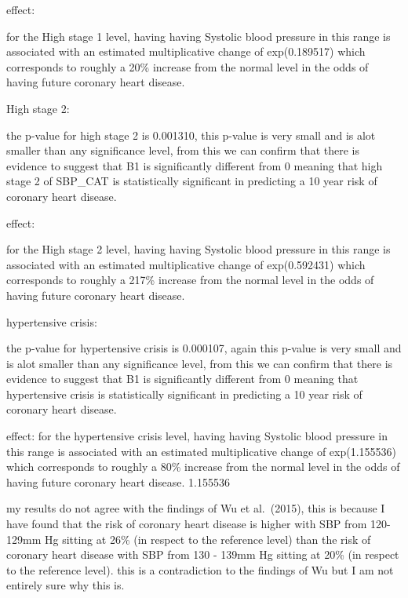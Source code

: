 \documentclass[
]{article}
\newenvironment{Shaded}{\begin{snugshade}}{\end{snugshade}}
\newcommand{\DataTypeTok}[1]{\textcolor[rgb]{0.13,0.29,0.53}{#1}}
\newcommand{\DecValTok}[1]{\textcolor[rgb]{0.00,0.00,0.81}{#1}}
\newcommand{\KeywordTok}[1]{\textcolor[rgb]{0.13,0.29,0.53}{\textbf{#1}}}
\newcommand{\NormalTok}[1]{#1}
\newcommand{\OperatorTok}[1]{\textcolor[rgb]{0.81,0.36,0.00}{\textbf{#1}}}
\newcommand{\StringTok}[1]{\textcolor[rgb]{0.31,0.60,0.02}{#1}}
\begin{document}
effect:

for the High stage 1 level, having having Systolic blood pressure in
this range is associated with an estimated multiplicative change of
exp(0.189517) which corresponds to roughly a 20\% increase from the
normal level in the odds of having future coronary heart disease.

High stage 2:

the p-value for high stage 2 is 0.001310, this p-value is very small and
is alot smaller than any significance level, from this we can confirm
that there is evidence to suggest that B1 is significantly different
from 0 meaning that high stage 2 of SBP\_CAT is statistically
significant in predicting a 10 year risk of coronary heart disease.

effect:

for the High stage 2 level, having having Systolic blood pressure in
this range is associated with an estimated multiplicative change of
exp(0.592431) which corresponds to roughly a 217\% increase from the
normal level in the odds of having future coronary heart disease.

hypertensive crisis:

the p-value for hypertensive crisis is 0.000107, again this p-value is
very small and is alot smaller than any significance level, from this we
can confirm that there is evidence to suggest that B1 is significantly
different from 0 meaning that hypertensive crisis is statistically
significant in predicting a 10 year risk of coronary heart disease.

effect: for the hypertensive crisis level, having having Systolic blood
pressure in this range is associated with an estimated multiplicative
change of exp(1.155536) which corresponds to roughly a 80\% increase
from the normal level in the odds of having future coronary heart
disease. 1.155536

my results do not agree with the findings of Wu et al.~(2015), this is
because I have found that the risk of coronary heart disease is higher
with SBP from 120-129mm Hg sitting at 26\% (in respect to the reference
level) than the risk of coronary heart disease with SBP from 130 - 139mm
Hg sitting at 20\% (in respect to the reference level). this is a
contradiction to the findings of Wu but I am not entirely sure why this
is.

\begin{Shaded}
\end{Shaded}
\end{document}
